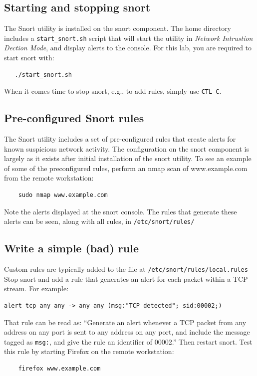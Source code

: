 \subsection{Starting and stopping snort}
The Snort utility is installed on the snort component.  The home directory includes a {\tt start\_snort.sh}
script that will start the utility in \textit{Network Intrustion Dection Mode}, and display alerts
to the console.  For this lab, you are required to start snort with:
\begin{verbatim}
   ./start_snort.sh
\end{verbatim}
When it comes time to stop snort, e.g., to add rules, simply use {\tt CTL-C}.

\subsection{Pre-configured Snort rules}
The Snort utility includes a set of pre-configured rules that create alerts for known
suspicious network activity. The configuration on the snort component is largely as it
exists after initial installation of the snort utility.  To see an example of 
some of the preconfigured rules, perform an nmap scan of www.example.com from the remote
workstation:
\begin{verbatim}
    sudo nmap www.example.com
\end{verbatim}
\noindent Note the alerts displayed at the snort console.  The rules that generate these alerts can be seen,
along with all rules, in {\tt /etc/snort/rules/}

\subsection{Write a simple (bad) rule}
Custom rules are typically added to the file at {\tt /etc/snort/rules/local.rules}
Stop snort and add a rule that generates an alert for each packet within a TCP stream. For example:
\begin{verbatim}
alert tcp any any -> any any (msg:"TCP detected"; sid:00002;)
\end{verbatim}

\noindent That rule can be read as: ``Generate an alert whenever a TCP packet from any
address on any  port is sent to any address on any port, and include the message tagged as
{\tt msg:}, and give the rule an identifier of 00002.''
Then restart snort.  Test this rule by starting Firefox on the remote workstation:

\begin{verbatim}
    firefox www.example.com
\end{verbatim}

